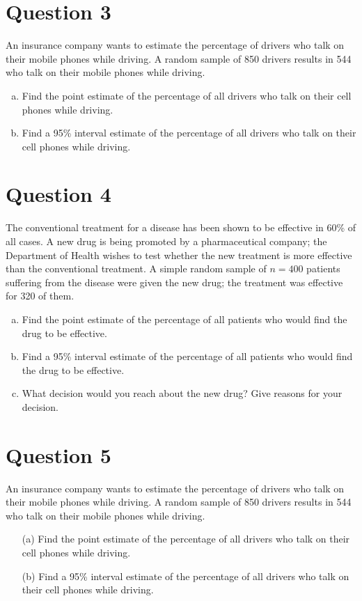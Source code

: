 \documentclass[]{article}
\begin{document}
\section*{Question 3}
An insurance company wants to estimate the percentage of drivers who talk on their mobile phones while driving. A random sample of 850 drivers results in 544 who talk on their mobile phones while driving.
\begin{enumerate}[(a)]
\item Find the point estimate of the percentage of all drivers who talk on their cell phones while driving.
\item Find a 95\% interval estimate of the percentage of all drivers who talk on their cell phones while driving.
\end{enumerate}


\section*{Question 4}

The conventional treatment for a disease has been shown to be effective in 60\% of all cases. A new drug is being promoted by a pharmaceutical company; the Department of Health wishes to test whether the new treatment is more effective than the conventional treatment. A simple random sample of $n= 400$ patients suffering from the disease were given the new drug; the treatment was effective for 320 of them. 
\begin{enumerate}[(a)]
\item Find the point estimate of the percentage of all patients who would find the drug to be effective.
\item Find a 95\% interval estimate of the percentage of all patients who would find the drug to be effective.
\item What decision would you reach about the new drug? Give reasons for your decision. 
\end{enumerate}

\section*{Question 5}
An insurance company wants to estimate the percentage of drivers who talk on their
mobile phones while driving.
A random sample of 850 drivers results in 544 who talk on their mobile phones while
driving.
\begin{itemize}
    \item[(a)] Find the point estimate of the percentage of all drivers who talk on their cell phones
while driving.
  \item[(b)] Find a 95\% interval estimate of the percentage of all drivers who talk on their cell
phones while driving.
\end{itemize}
\end{document}
